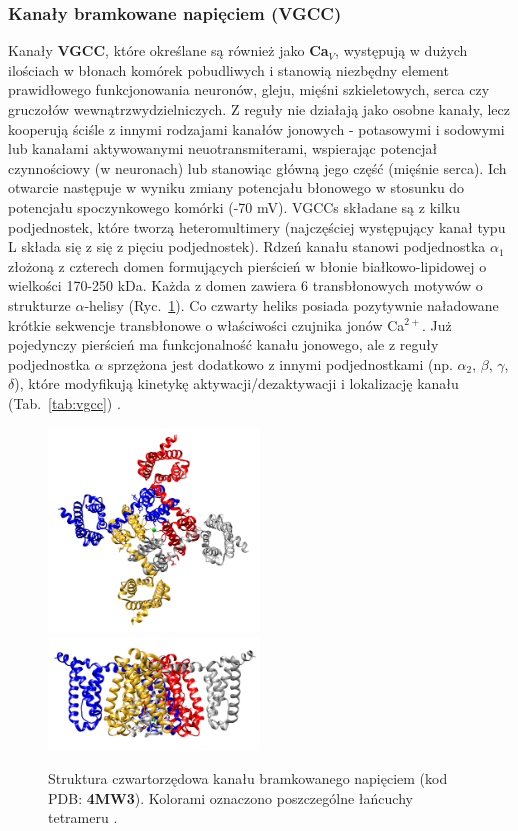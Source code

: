 \FloatBarrier
\subsubsection{Kanały bramkowane napięciem (VGCC)}\label{ss:vgcc}

Kanały \textbf{VGCC}, które określane są również jako\textbf{ Ca$_V$}, występują w dużych ilościach w błonach komórek pobudliwych i stanowią niezbędny element prawidłowego funkcjonowania neuronów, gleju, mięśni szkieletowych, serca czy gruczołów wewnątrzwydzielniczych. Z reguły nie działają jako osobne kanały, lecz kooperują ściśle z innymi rodzajami kanałów jonowych - potasowymi i sodowymi lub kanałami aktywowanymi neuotransmiterami, wspierając potencjał czynnościowy (w neuronach) lub stanowiąc główną jego część (mięśnie serca). Ich otwarcie następuje w wyniku zmiany potencjału błonowego w stosunku do potencjału spoczynkowego komórki (-70 mV). VGCCs składane są z kilku podjednostek, które tworzą heteromultimery (najczęściej występujący kanał typu L składa się z się z pięciu podjednostek). Rdzeń kanału stanowi podjednostka $\alpha_1$ złożoną z czterech domen formujących pierścień w błonie białkowo-lipidowej o wielkości 170-250 kDa. Każda z domen zawiera 6 transbłonowych motywów o strukturze $\alpha$-helisy (Ryc.~\ref{fig:vgcc}). Co czwarty heliks posiada pozytywnie naładowane krótkie sekwencje transbłonowe o właściwości czujnika jonów Ca$^{2+}$. Już pojedynczy pierścień ma funkcjonalność kanału jonowego, ale z reguły podjednostka $\alpha$ sprzężona jest dodatkowo z innymi podjednostkami (np. $\alpha_2$, $\beta$, $\gamma$, $\delta$), które modyfikują kinetykę aktywacji/dezaktywacji i lokalizację kanału (Tab.~\ref{tab:vgcc}) \cite{Tang2014,Yamakage2002}.

\begin{figure}[h]
\centering
\includegraphics[width=0.5\textwidth]{rysunki/rozdzial_1/vgcc.png}%
\includegraphics[width=0.5\textwidth]{rysunki/rozdzial_1/vgcc2.png}%
\caption [Struktura kanału VGCC]{Struktura czwartorzędowa kanału bramkowanego napięciem (kod PDB: \textbf{4MW3}). Kolorami oznaczono poszczególne łańcuchy tetrameru \cite{Tang2014}.}
\label{fig:vgcc}
\end{figure}

